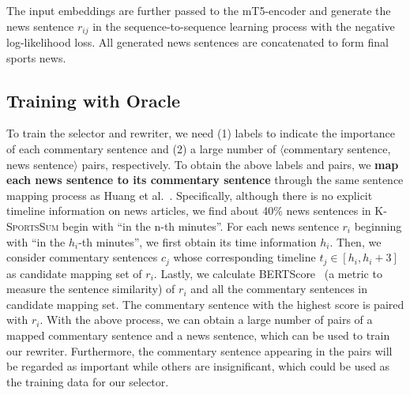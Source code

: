 The input embeddings are further passed to the mT5-encoder and generate the news sentence $r_{ij}$ in the sequence-to-sequence learning process with the negative log-likelihood loss.
All generated news sentences are concatenated to form final sports news.

\subsection{Training with Oracle}
\label{sec:sentence_pairs}
To train the selector and rewriter, we need (1) labels to indicate the importance of each commentary sentence and (2) a large number of $\langle$commentary sentence, news sentence$\rangle$ pairs, respectively.
To obtain the above labels and pairs, we \textbf{map each news sentence to its commentary sentence} through the same sentence mapping process as Huang et al.~\cite{Huang2020GeneratingSN}.
Specifically, although there is no explicit timeline information on news articles, we find about 40\% news sentences in \textsc{K-SportsSum} begin with ``in the n-th minutes''.
For each news sentence $r_{i}$ beginning with ``in the $h_{i}$-th minutes'', we first obtain its time information $h_{i}$. Then, we consider commentary sentences $c_{j}$ whose corresponding timeline $t_{j} \in [h_{i},h_{i}+3]$ as candidate mapping set of $r_{i}$. Lastly, we calculate BERTScore~\cite{Zhang2020BERTScoreET} (a metric to measure the sentence similarity) of $r_{i}$ and all the commentary sentences in candidate mapping set. The commentary sentence with the highest score is paired with $r_{i}$.
With the above process, we can obtain a large number of pairs of a mapped commentary sentence and a news sentence, which can be used to train our rewriter. Furthermore, the commentary sentence appearing in the pairs will be regarded as important while others are insignificant, which could be used as the training data for our selector.

